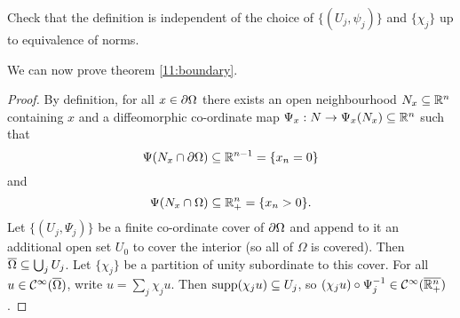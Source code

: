 \begin{exer}
  Check that the definition is independent of the choice of $\{(U_j,\psi_j)\}$ and $\{\chi_j\}$ up to equivalence of norms.
\end{exer}

We can now prove theorem \ref{11:boundary}.


\begin{proof}
  By definition, for all $x\in\partial\Omega$ there exists an open neighbourhood $N_x\subseteq\mathbb{R}^n$ containing $x$ and a diffeomorphic co-ordinate map $\Psi_x: N \to \Psi_x(N_x)\subseteq\mathbb{R}^n$ such that
  \[ \Psi(N_x\cap\partial\Omega)\subseteq\mathbb{R}^{n-1}=\{x_n=0\} \]
  and 
  \[ \Psi(N_x\cap\Omega)\subseteq\mathbb{R}_+^n=\{x_n>0\}. \]
  Let $\{(U_j,\Psi_j)\}$ be a finite co-ordinate cover of $\partial\Omega$ and append to it an additional open set $U_0$ to cover the interior (so all of $\Omega$ is covered).
  Then $\overline\Omega \subseteq \bigcup_j U_j$.
  Let $\{\chi_j\}$ be a partition of unity subordinate to this cover.
  For all $u\in\mathcal{C}^\infty(\overline\Omega)$, write $u=\sum_j\chi_ju$.
  Then $\operatorname{supp}(\chi_ju)\subseteq U_j$, so $(\chi_ju)\circ\Psi_j^{-1}\in\mathcal{C}^\infty(\overline{\mathbb{R}_+^n})$.
\end{proof}
